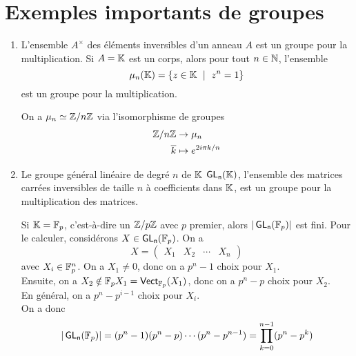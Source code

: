 \section{Exemples importants de groupes}\label{sec:exemples-importants-de-groupes}

\begin{enumerate}[label=(\roman*)]
    \item L'ensemble \(A^\times\) des éléments inversibles
    d'un anneau \(A\) est un groupe pour la multiplication.
    Si \(A = \mathbb{K}\) est un corps, alors pour tout \(n\in\mathbb{N}\),
    l'ensemble
    \begin{equation*}
        \mu_n(\bb K) = \left\{z\in\bb K\ \mid\ z^n=1\right\}
    \end{equation*}
    est un groupe pour la multiplication.
    \begin{remark}
        On a \(\mu_n \simeq \mathbb{Z}/n\mathbb{Z}\) via l'isomorphisme de groupes
        \begin{equation*}
            \begin{aligned}
                \mathbb{Z}/n\mathbb{Z} &\to \mu_n\\
                \overline{k} &\mapsto e^{2i\pi k/n}
            \end{aligned}
        \end{equation*}
    \end{remark}

    \item Le groupe général linéaire de degré \(n\) de \(\mathbb{K}\) \(\operatorname{\mathsf{GL_{n}}}(\mathbb{K})\),
    l'ensemble des matrices carrées inversibles de taille \(n\) à coefficients 
    dans \(\mathbb{K}\), est un groupe pour la multiplication des matrices.
    \begin{remark}
        Si \(\mathbb{K} = \mathbb{F}_p\), c'est-à-dire un \(\mathbb{Z}/p\mathbb{Z}\) avec \(p\) premier,
        alors \(| \operatorname{\mathsf{GL_{n}}}(\mathbb{F}_p) |\) est fini. Pour le calculer, considérons
        \(X \in \operatorname{\mathsf{GL_{n}}}(\mathbb{F}_p)\). On a
        \begin{equation*}
            X = \begin{pmatrix}
                X_1 & X_2 & \cdots & X_n
            \end{pmatrix}
        \end{equation*}
        avec \(X_i \in \mathbb{F}_p^n\). On a \(X_1 \neq 0\), donc on a \(p^n - 1\) choix
        pour \(X_1\). \\
        Ensuite, on a \(X_2\notin \mathbb{F}_p X_1 = \operatorname{\mathsf{Vect}}_{\mathbb{F}_p}(X_1)\), donc on a
        \(p^n - p\) choix pour \(X_2\). \\
        En général, on a \(p^n - p^{i-1}\) choix pour \(X_i\). \\
        On a donc
        \begin{equation*}
            | \operatorname{\mathsf{GL_{n}}}(\mathbb{F}_p) | = (p^n - 1)(p^n - p)\cdots(p^n - p^{n-1}) = \prod_{k=0}^{n-1} (p^n - p^k)
        \end{equation*}
    \end{remark}


\end{enumerate}
